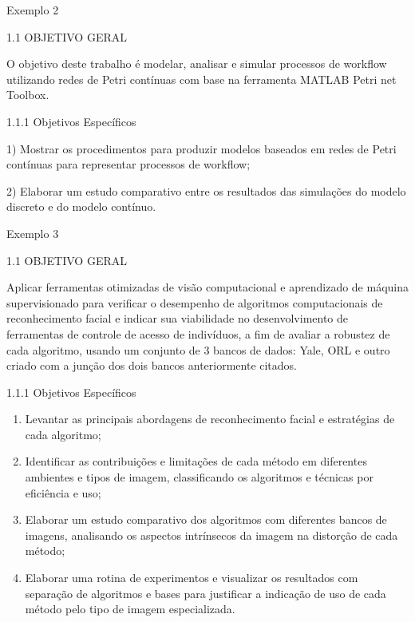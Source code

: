 

Exemplo 2 \\



\begin{mdframed}
	
1.1 OBJETIVO GERAL

O objetivo deste trabalho é modelar, analisar e simular processos de workflow utilizando redes de Petri contínuas com base na ferramenta MATLAB Petri net Toolbox. 

1.1.1 Objetivos Específicos

1)	Mostrar os procedimentos para produzir modelos baseados em redes de Petri contínuas para representar processos de workflow; 

2)	Elaborar um estudo comparativo entre os resultados das simulações do modelo discreto e do modelo contínuo. \linebreak

\end{mdframed}


Exemplo 3  \\



\begin{mdframed}
	
1.1 OBJETIVO GERAL

Aplicar ferramentas otimizadas de visão computacional e aprendizado de máquina supervisionado para verificar o desempenho de algoritmos computacionais de reconhecimento facial e indicar sua viabilidade no desenvolvimento de ferramentas de controle de acesso de indivíduos, a fim de avaliar a robustez de cada algoritmo, usando um conjunto de 3 bancos de dados: Yale, ORL e outro criado com a junção dos dois bancos anteriormente citados.

1.1.1 Objetivos Específicos
\begin{enumerate}
	\item Levantar as principais abordagens de reconhecimento facial e estratégias de cada algoritmo; 
	
	\item Identificar as contribuições e limitações de cada método em diferentes ambientes e tipos de imagem, classificando os algoritmos e técnicas por eficiência e uso;
	
	\item Elaborar um estudo comparativo dos algoritmos com diferentes bancos de imagens, analisando os aspectos intrínsecos da imagem na distorção de cada método;
	
	\item Elaborar uma rotina de experimentos e visualizar os resultados com separação de algoritmos e bases para justificar a indicação de uso de cada método pelo tipo de imagem especializada.\linebreak
	
\end{enumerate}

\end{mdframed}

